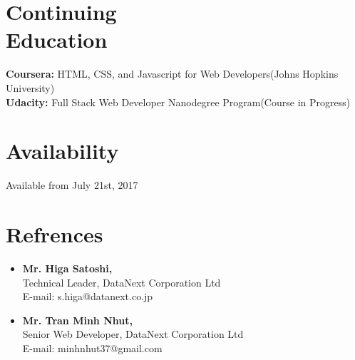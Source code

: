 \documentclass[margin,line]{res}
\begin{document}
\begin{resume}
\section{Continuing \\Education}
{\bf Coursera:} HTML, CSS, and Javascript for Web Developers(Johns Hopkins University)\\
{\bf Udacity:} Full Stack Web Developer Nanodegree Program(Course in Progress)

\section{Availability}
Available from July 21st, 2017
\section{Refrences}
\begin{itemize} \itemsep -2pt  %
  \item {\bf Mr. Higa Satoshi,}\\
  Technical Leader, DataNext Corporation Ltd \\
  E-mail: s.higa@datanext.co.jp \\



  \item {\bf Mr. Tran Minh Nhut,}\\
  Senior Web Developer, DataNext Corporation Ltd \\
  E-mail: minhnhut37@gmail.com \\

\end{itemize}

\end{resume} 
\end{document}
